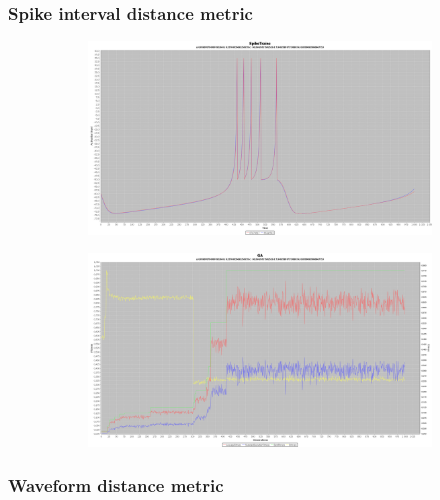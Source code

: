 \documentclass[12pt]{article}
\begin{document}
		\subsubsection{Spike interval distance metric}
			\begin{figure}[H]
				\centering
					\begin{subfigure}{.5\textwidth}
						\centering
						\includegraphics[width=\linewidth]{./../images/izzy1/interval/plot.png}
						
						\label{fig:sub2a}
					\end{subfigure}%
					\begin{subfigure}{.5\textwidth}
						\centering
						\includegraphics[width=\linewidth]{./../images/izzy1/interval/prog.png}
						
						\label{fig:sub2b}
					\end{subfigure}
					
					\label{fig:plot2}
			\end{figure}
		
		\subsubsection{Waveform distance metric}
		
\end{document}
